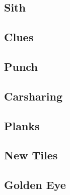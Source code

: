 \documentclass[10pt,a4paper,twoside]{report}
\begin{document}
\newpage
\subsection*{Sith}
\begin{keywords}\end{keywords}



\newpage
\subsection*{Clues}
\begin{keywords}\end{keywords}


\newpage
\subsection*{Punch}
\begin{keywords}\end{keywords}


\newpage
\subsection*{Carsharing}
\begin{keywords}\end{keywords}


\newpage
\subsection*{Planks}
\begin{keywords}\end{keywords}



\newpage
\subsection*{New Tiles}
\begin{keywords}\end{keywords}


\newpage
\subsection*{Golden Eye}
\begin{keywords}\end{keywords}

\end{document}
